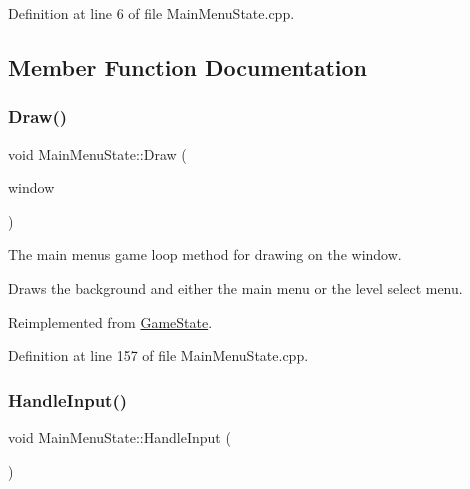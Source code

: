Definition at line 6 of file Main\+Menu\+State.\+cpp.



\subsection{Member Function Documentation}
\mbox{\label{class_main_menu_state_a6965e10d73953ef09c63a64685136307}} 
\subsubsection{\texorpdfstring{Draw()}{Draw()}}
{\footnotesize\ttfamily void Main\+Menu\+State\+::\+Draw (\begin{DoxyParamCaption}\item[{sf\+::\+Render\+Window \&}]{window }\end{DoxyParamCaption})\hspace{0.3cm}{\ttfamily [virtual]}}



The main menu\textquotesingle{}s game loop method for drawing on the window. 

Draws the background and either the main menu or the level select menu. 

Reimplemented from \hyperlink{class_game_state_a8741c5c696c6c366beb4b845c08c3cf8}{Game\+State}.



Definition at line 157 of file Main\+Menu\+State.\+cpp.

\mbox{\label{class_main_menu_state_ac332ae234d282f4e6657ee9d0685b7ff}} 
\subsubsection{\texorpdfstring{Handle\+Input()}{HandleInput()}}
{\footnotesize\ttfamily void Main\+Menu\+State\+::\+Handle\+Input (\begin{DoxyParamCaption}{ }\end{DoxyParamCaption})\hspace{0.3cm}{\ttfamily [virtual]}}



